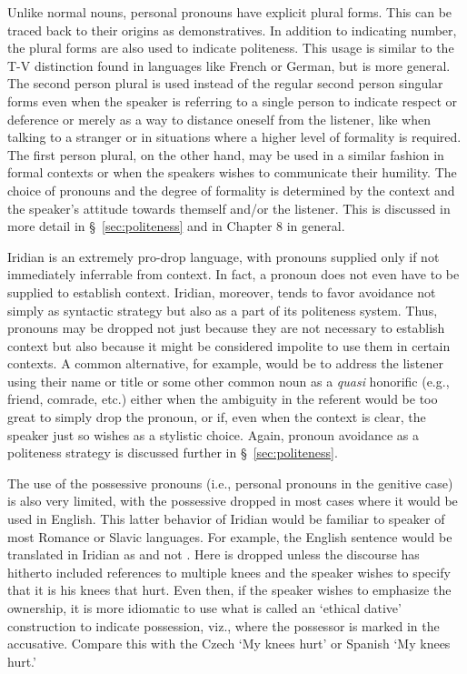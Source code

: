 Unlike normal nouns, personal pronouns have explicit plural forms. This can be
traced back to their origins as demonstratives. In addition to indicating
number, the plural forms are also used to indicate politeness. This usage is
similar to the T-V distinction found in languages like French or German, but is
more general. The second person plural is used instead of the regular second
person singular forms even when the speaker is referring to a single person to
indicate respect or deference or merely as a way to distance oneself from the
listener, like when talking to a stranger or in situations where a higher level
of formality is required. The first person plural, on the other hand, may be
used in a similar fashion in formal contexts or when the speakers wishes to
communicate their humility. The choice of pronouns and the degree of formality
is determined by the context and the speaker's attitude towards themself and/or
the listener. This is discussed in more detail in \S~\ref{sec:politeness} and in
Chapter 8 in general.

Iridian is an extremely pro-drop language, with pronouns supplied only if not
immediately inferrable from context. In fact, a pronoun does not even have to be
supplied to establish context. Iridian, moreover, tends to favor avoidance not
simply as syntactic strategy but also as a part of its politeness system. Thus,
pronouns may be dropped not just because they are not necessary to establish
context but also because it might be considered impolite to use them in certain
contexts. A common alternative, for example, would be to address the listener
using their name or title or some other common noun as a \emph{quasi} honorific
(e.g., friend, comrade, etc.) either when the ambiguity in the referent would be
too great to simply drop the pronoun, or if, even when the context is clear, the
speaker just so wishes as a stylistic choice. Again, pronoun avoidance as a
politeness strategy is discussed further in \S~\ref{sec:politeness}.

The use of the possessive pronouns (i.e., personal pronouns in the genitive
case) is also very limited, with the possessive dropped in most cases where it
would be used in English. This latter behavior of Iridian would be familiar to
speaker of most Romance or Slavic languages. For example, the English sentence
 would be translated in Iridian as  and
not . Here  is dropped unless the discourse
has hitherto included references to multiple knees and the speaker wishes to
specify that it is his knees that hurt. Even then, if the speaker wishes to
emphasize the ownership, it is more idiomatic to use what is called an `ethical
dative' construction to indicate possession, viz.,
 where the possessor is marked in the accusative. Compare
this with the Czech  `My knees hurt' or Spanish
 `My knees hurt.'

